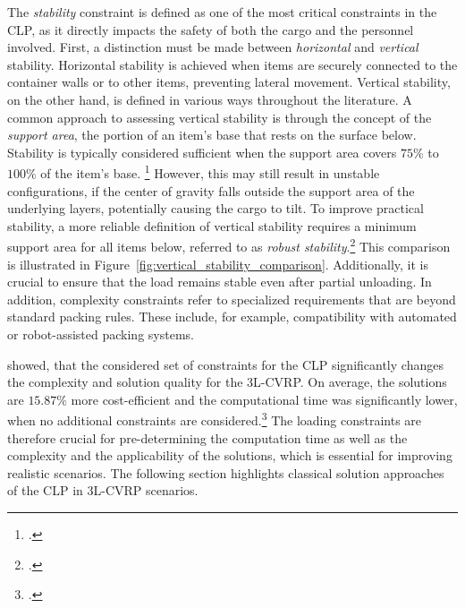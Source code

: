 The \textit{stability} constraint is defined as one of the most critical constraints
in the \gls{CLP}, as it directly impacts the safety of both the cargo and the personnel involved.
First, a distinction must be made between \textit{horizontal} and \textit{vertical} stability.
Horizontal stability is achieved when items are securely connected to the
container walls or to other items, preventing lateral movement. Vertical
stability, on the other hand, is defined in various ways throughout the
literature. A common approach to assessing vertical stability is through the concept of the \textit{support
    area}, the portion of an item's base that rests on the surface below. Stability is typically
considered sufficient when the support area covers $75\%$ to $100\%$ of the item’s base. \footcite[cf.][p. 344]{gendreau_tabu_2006} However,
this may still result in unstable configurations, if the center of gravity falls outside the
support area of the underlying layers, potentially causing the cargo to tilt. To improve practical stability,
a more reliable definition of vertical stability requires a minimum support area for all items below,
referred to as \textit{robust stability}.\footcite[cf.][p. 1140]{ceschia_local_2013} This comparison is illustrated in Figure~\ref{fig:vertical_stability_comparison}.
Additionally, it is crucial to ensure that the load remains stable even after partial unloading.
In addition, complexity constraints refer to specialized
requirements that are beyond standard packing rules. These include, for example, compatibility with automated or robot-assisted packing systems.


\cite{gendreau_tabu_2006} showed, that the considered set of constraints for the \gls{CLP} significantly
changes the complexity and solution quality for the \gls{3L-CVRP}. On average, the solutions are $15.87\%$ more
cost-efficient and the computational time was significantly lower, when no additional constraints are considered.\footcite[cf.][p. 348]{gendreau_tabu_2006}
The loading constraints are therefore crucial for pre-determining the computation time as well as the complexity and the applicability
of the solutions, which is essential for improving realistic scenarios.
The following section highlights classical solution approaches of the \gls{CLP} in \gls{3L-CVRP} scenarios.


